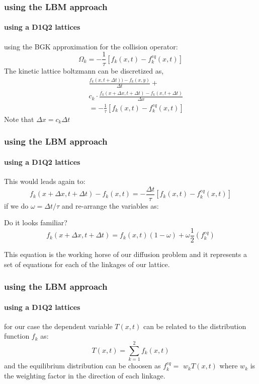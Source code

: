 \documentclass[12pt]{beamer}
\begin{document}
\begin{frame}
  \frametitle{using the LBM approach}
  \framesubtitle{using a D1Q2 lattices}
  using the BGK approximation for the collision operator:
  \begin{equation} \nonumber
   \Omega_k = -\frac{1}{\tau}[f_k(x,t)-f_k^{eq}(x,t)]
  \end{equation}
  The kinetic lattice boltzmann can be discretized as,
  \begin{eqnarray}
   && \frac{f_k(x,t+\Delta t))- f_k(x,y)}{\Delta t} + \nonumber \\
   && c_k\cdot\frac{f_k(x+\Delta x,t+\Delta t)- f_k(x,t+\Delta t)}{\Delta x} \nonumber \\
   && = -\frac{1}{\tau}[f_k(x,t)-f_k^{eq}(x,t)] 
  \end{eqnarray}
  Note that $\Delta x = c_k \Delta t$
\end{frame}

\begin{frame}
  \frametitle{using the LBM approach}
  \framesubtitle{using a D1Q2 lattices}
  This would leads again to:
  \begin{equation} \nonumber
    f_k(x+\Delta x,t+\Delta t)-f_k(x,t)=-\frac{\Delta t}{\tau}[f_k(x,t)-f_k^{eq}(x,t)] 
  \end{equation}
  if we do $\omega = \Delta t/ \tau$ and re-arrange the variables as:
  \begin{alertblock}{Do it looks familiar?}
  \begin{equation} \nonumber
   f_k(x+\Delta x,t+\Delta t) = f_k(x,t)\left(1-\omega\right) + \omega\frac{1}{2} \left(f_k^{eq}\right)
  \end{equation}
  \end{alertblock}
  This equation is the working horse of our diffusion problem and it represents 
  a set of equations for each of the linkages of our lattice.
\end{frame}

\begin{frame}
  \frametitle{using the LBM approach}
  \framesubtitle{using a D1Q2 lattices}
  for our case the dependent variable $T(x,t)$ can be related to the distribution function $f_k$ as:
  \begin{equation}
   T(x,t) = \sum_{k=1}^{2} f_k(x,t)
  \end{equation}
  and the equilibrium distribution can be choosen as $f_k^{eq} =$ $w_k T(x,t)$ where $w_k$ is 
  the weighting factor in the direction of each linkage.
\end{frame}
\end{document}
